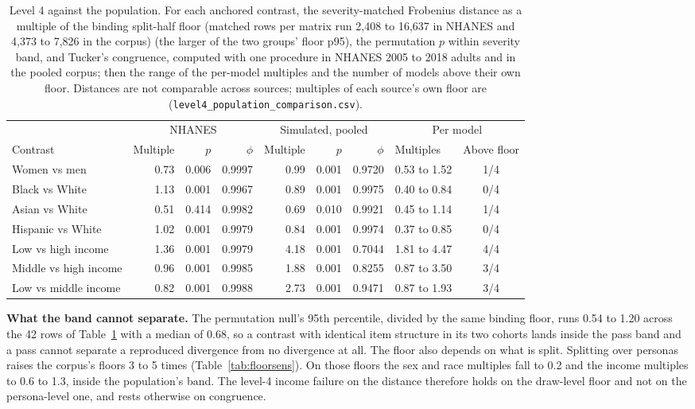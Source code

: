 \documentclass[wcp]{jmlr}
\begin{document}
\begin{table}[!htb]
\centering
\caption{Level 4 against the population. For each anchored contrast, the severity-matched Frobenius distance as a multiple of the binding split-half floor (matched rows per matrix run 2,408 to 16,637 in NHANES and 4,373 to 7,826 in the corpus) (the larger of the two groups' floor p95), the permutation $p$ within severity band, and Tucker's congruence, computed with one procedure in NHANES 2005 to 2018 adults and in the pooled corpus; then the range of the per-model multiples and the number of models above their own floor. Distances are not comparable across sources; multiples of each source's own floor are (\texttt{level4\_population\_comparison.csv}).}
\label{tab:popref}
\scriptsize
\setlength{\tabcolsep}{3pt}
\begin{tabular}{lrrrrrrlc}
\toprule
 & \multicolumn{3}{c}{NHANES} & \multicolumn{3}{c}{Simulated, pooled} & \multicolumn{2}{c}{Per model} \\
\cmidrule(lr){2-4}\cmidrule(lr){5-7}\cmidrule(lr){8-9}
Contrast & Multiple & $p$ & $\phi$ & Multiple & $p$ & $\phi$ & Multiples & Above floor \\
\midrule
Women vs men & 0.73 & 0.006 & 0.9997 & 0.99 & 0.001 & 0.9720 & 0.53 to 1.52 & 1/4 \\
Black vs White & 1.13 & 0.001 & 0.9967 & 0.89 & 0.001 & 0.9975 & 0.40 to 0.84 & 0/4 \\
Asian vs White & 0.51 & 0.414 & 0.9982 & 0.69 & 0.010 & 0.9921 & 0.45 to 1.14 & 1/4 \\
Hispanic vs White & 1.02 & 0.001 & 0.9979 & 0.84 & 0.001 & 0.9974 & 0.37 to 0.85 & 0/4 \\
Low vs high income & 1.36 & 0.001 & 0.9979 & 4.18 & 0.001 & 0.7044 & 1.81 to 4.47 & 4/4 \\
Middle vs high income & 0.96 & 0.001 & 0.9985 & 1.88 & 0.001 & 0.8255 & 0.87 to 3.50 & 3/4 \\
Low vs middle income & 0.82 & 0.001 & 0.9988 & 2.73 & 0.001 & 0.9471 & 0.87 to 1.93 & 3/4 \\
\bottomrule
\end{tabular}
\end{table}

\textbf{What the band cannot separate.} The permutation null's 95th percentile, divided by the same binding floor, runs 0.54 to 1.20 across the 42 rows of Table~\ref{tab:popref} with a median of 0.68, so a contrast with identical item structure in its two cohorts lands inside the pass band and a pass cannot separate a reproduced divergence from no divergence at all. The floor also depends on what is split. Splitting over personas raises the corpus's floors 3 to 5 times (Table~\ref{tab:floorsens}). On those floors the sex and race multiples fall to 0.2 and the income multiples to 0.6 to 1.3, inside the population's band. The level-4 income failure on the distance therefore holds on the draw-level floor and not on the persona-level one, and rests otherwise on congruence.
\end{document}
